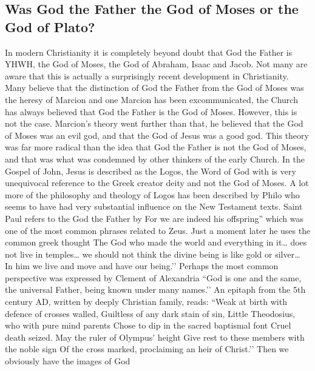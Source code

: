 \subsection{Was God the Father the God of Moses or the God of Plato?}\label{subsec:was-god-the-father-the-god-of-moses-or-the-god-of-plato}
In modern Christianity it is completely beyond doubt that God the Father is YHWH, the God of Moses, the God of Abraham, Isaac and Jacob.
Not many are aware that this is actually a surprisingly recent development in Christianity.
Many believe that the distinction of God the Father from the God of Moses was the heresy of Marcion and one Marcion has been excommunicated, the Church has always believed that God the Father is the God of Moses.
However, this is not the case.
Marcion’s theory went further than that, he believed that the God of Moses was an evil god, and that the God of Jesus was a good god.
This theory was far more radical than the idea that God the Father is not the God of Moses, and that was what was condemned by other thinkers of the early Church.
In the Gospel of John, Jesus is described as the Logos, the Word of God with is very unequivocal reference to the Greek creator deity and not the God of Moses.
A lot more of the philosophy and theology of Logos has been described by Philo who seems to have had very substantial influence on the New Testament texts.
Saint Paul refers to the God the Father by For we are indeed his offspring'' which was one of the most common phrases related to Zeus.
Just a moment later he uses the common greek thought The God who made the world and everything in it\ldots{} does not live in temples\ldots{} we should not think the divine being is like gold or silver\ldots{} In him we live and move and have our being.’’
Perhaps the most common perspective was expressed by Clement of Alexandria ``God is one and the same, the universal Father, being known under many names.’’
An epitaph from the 5th century AD, written by deeply Christian family, reads: ``Weak at birth with defence of crosses walled, Guiltless of any dark stain of sin, Little Theodosius, who with pure mind parents Chose to dip in the sacred baptismal font Cruel death seized.
May the ruler of Olympus’ height Give rest to these members with the noble sign Of the cross marked, proclaiming an heir of Christ.’’
Then we obviously have the images of God
